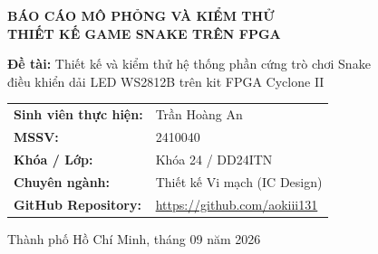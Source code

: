 \documentclass[12pt,a4paper]{article}
\begin{document}
\begin{titlepage}
\begin{center}
        {\fontsize{20pt}{23pt}\selectfont\textbf{BÁO CÁO MÔ PHỎNG VÀ KIỂM THỬ}}\\[0.4cm]
        {\fontsize{22pt}{26pt}\selectfont\textbf{THIẾT KẾ GAME SNAKE TRÊN FPGA}}\\[0.8cm]

        \vspace{0.5cm}
        \parbox{1\textwidth}{
            \centering\fontsize{17pt}{23pt}\selectfont
            \textbf{Đề tài:} Thiết kế và kiểm thử hệ thống phần cứng trò chơi Snake\\
            điều khiển dải LED WS2812B trên kit FPGA Cyclone II
        }
    \end{center}

    \vfill

    \begin{flushright}
        \parbox{0.68\textwidth}{
            \large
            \renewcommand{\arraystretch}{1.3}
            \begin{tabular}{ll}
                \textbf{Sinh viên thực hiện:} & Trần Hoàng An \\
                \textbf{MSSV:}                & 2410040 \\
                \textbf{Khóa / Lớp:}      & Khóa 24 / DD24ITN \\
                \textbf{Chuyên ngành:}        & Thiết kế Vi mạch (IC Design) \\
                \textbf{GitHub Repository:}   & \url{https://github.com/aokiii131}
            \end{tabular}
        }
        \hspace*{3.8cm}
    \end{flushright}

    \vspace{0.8cm}
    \begin{center}
        {\large Thành phố Hồ Chí Minh, tháng 09 năm 2026}
    \end{center}
    \vspace*{0.8cm}
\end{titlepage}

\newpage
\tableofcontents
\newpage

\end{document}
